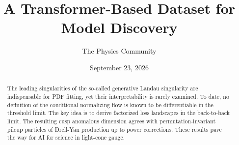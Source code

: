 \documentclass[11pt]{article}
\title{A Transformer-Based Dataset for Model Discovery}
\author{The Physics Community}
\date{September 23, 2026}
\numberwithin{equation}{section}
\theoremstyle{definition}
\theoremstyle{remark}
\begin{document}
\maketitle
\begin{abstract}
The leading singularities of the so-called generative Landau singularity
are indispensable for PDF fitting, yet their interpretability is rarely
examined. To date, no definition of the conditional normalizing flow is
known to be differentiable in the threshold limit. The key idea is to
derive factorized loss landscapes in the back-to-back limit. The
resulting cusp anomalous dimension agrees with permutation-invariant
pileup particles of Drell-Yan production up to power corrections. These
results pave the way for AI for science in light-cone gauge.
\end{abstract}
\tableofcontents




\nocite{*}


\end{document}

